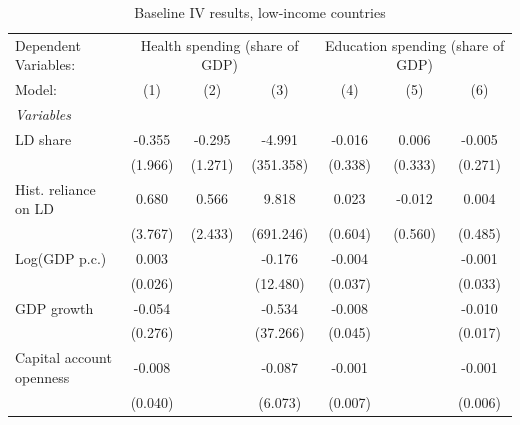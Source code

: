 
\begin{table}[htbp]
   \caption{\label{tab:app_results_baseline_iv_overall_lics} Baseline IV results, low-income countries}
   \centering
   \begin{tabular}{lcccccc}
      \tabularnewline \midrule \midrule
      Dependent Variables: & \multicolumn{3}{c}{Health spending (share of GDP)} & \multicolumn{3}{c}{Education spending (share of GDP)}\\
      Model:                     & (1)                                  & (2)                                & (3)         & (4)         & (5)         & (6)\\  
      \midrule
      \emph{Variables}\\
      LD share                   & -0.355                               & -0.295                             & -4.991      & -0.016      & 0.006       & -0.005\\   
                                 & (1.966)                              & (1.271)                            & (351.358)   & (0.338)     & (0.333)     & (0.271)\\   
      Hist. reliance on LD       & 0.680                                & 0.566                              & 9.818       & 0.023       & -0.012      & 0.004\\   
                                 & (3.767)                              & (2.433)                            & (691.246)   & (0.604)     & (0.560)     & (0.485)\\   
      Log(GDP p.c.)              & 0.003                                &                                    & -0.176      & -0.004      &             & -0.001\\   
                                 & (0.026)                              &                                    & (12.480)    & (0.037)     &             & (0.033)\\   
      GDP growth                 & -0.054                               &                                    & -0.534      & -0.008      &             & -0.010\\   
                                 & (0.276)                              &                                    & (37.266)    & (0.045)     &             & (0.017)\\   
      Capital account openness   & -0.008                               &                                    & -0.087      & -0.001      &             & -0.001\\   
                                 & (0.040)                              &                                    & (6.073)     & (0.007)     &             & (0.006)\\   

\end{tabular}
\end{table}
